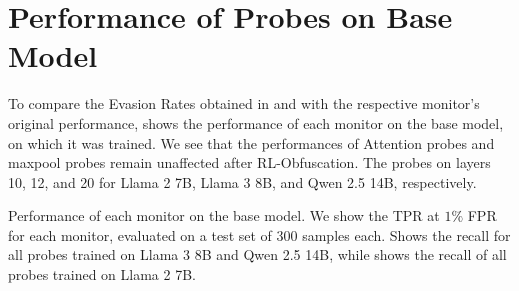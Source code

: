 %     

\vspace{-4pt}
\section{Performance of Probes on Base Model} 
\vspace{-4pt}
\label{sec:og_probe_perf}
To compare the Evasion Rates obtained in  and  with the respective monitor's original performance,  shows the performance of each monitor on the base model, on which it was trained. 
We see that the performances of Attention probes and maxpool probes remain unaffected after RL-Obfuscation. The probes on layers 10, 12, and 20 for Llama 2 7B, Llama 3 8B, and Qwen 2.5 14B, respectively. 

\begin{table}[h]
    \centering
    \begin{subtable}{0.42\textwidth}
        \centering
        
        \caption{}
        \label{tab:probe_og_a}
    \end{subtable}
    \hfill
    \begin{subtable}{0.42\textwidth}
        \centering
        
        \caption{}
        \label{tab:probe_og_b}
    \end{subtable}
    \caption{Performance of each monitor on the base model. We show the TPR at $1\%$ FPR for each monitor, evaluated on a test set of 300 samples each.  Shows the recall for all probes trained on Llama 3 8B and Qwen 2.5 14B, while  shows the recall of all probes trained on Llama 2 7B.}
    \label{tab:probe_og}
    \vspace{-8pt}
\end{table}

